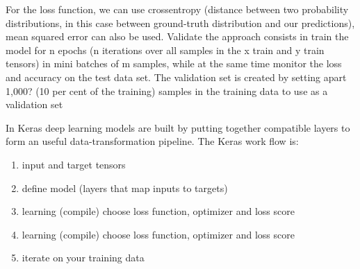 \documentclass[11pt]{article}
\begin{document}
For the loss function, we can use crossentropy (distance between two probability distributions, in this case between ground-truth distribution and our predictions), mean squared error can also be used.
Validate the approach consists in train the model for n epochs (n iterations over all samples in the x train and y train tensors) in mini batches of m samples, while at the same time monitor the loss and accuracy on the test data set.
The validation set is created by setting apart  1,000? (10 per cent of the training) samples in the training data to use as a validation set

In Keras deep learning models are built by putting together compatible layers to form an useful data-transformation pipeline.  The Keras work flow is:
\begin{enumerate}
\item input and target tensors
\item define model (layers that map inputs to targets)
\item learning (compile) choose loss function, optimizer and loss score 
\item learning (compile) choose loss function, optimizer and loss score 
\item iterate on your training data %

\end{enumerate}

\end{document}
